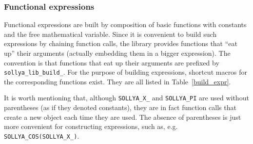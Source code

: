 \documentclass[a4paper]{article}
\begin{document}
\subsubsection{Functional expressions}
Functional expressions are built by composition of basic functions with constants and the free mathematical variable. Since it is convenient to build such expressions by chaining function calls, the library provides functions that ``eat up'' their arguments (actually embedding them in a bigger expression). The convention is that functions that eat up their arguments are prefixed by \texttt{sollya\_lib\_build\_}. For the purpose of building expressions, shortcut macros for the corresponding functions exist. They are all listed in Table~\ref{build_expr}.

It is worth mentioning that, although \texttt{SOLLYA\_X\_} and \texttt{SOLLYA\_PI} are used without parentheses (as if they denoted constants), they are in fact function calls that create a new object each time they are used. The absence of parentheses is just more convenient for constructing expressions, such as, e.g. \texttt{SOLLYA\_COS(SOLLYA\_X\_)}.
\end{document}
